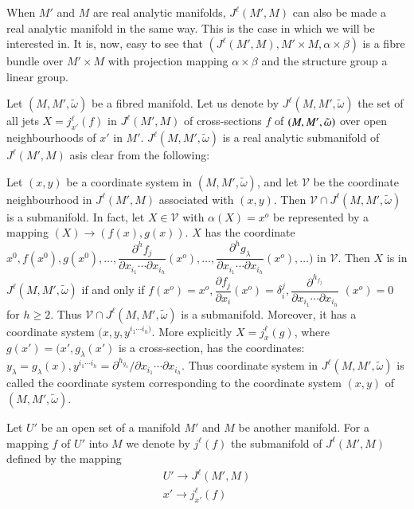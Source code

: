 When $M'$ and $M$ are real analytic manifolds, $J^\ell (M', M)$ can
also be made a real analytic manifold in the same way. This is the
case in which we will be interested in. It is, now, easy to see that
$(J^\ell(M',M), M' \times M, \alpha \times \beta)$ is a fibre bundle
over $M' \times M$ with projection mapping $\alpha \times \beta$ and
the structure group a linear group. 
  
Let $(M, M', \tilde{\omega})$ be a fibred manifold. Let us denote by
$J^\ell (M,M', \tilde{\omega})$ the set of all jets $X=
j^\ell_{x'}(f)$ in $J^\ell (M',M)$ of cross-sections $f$ of $(M,M',\break
\tilde{\omega})$ over open neighbourhoods of $x'$ in $M'$. $J^\ell
(M,M', \tilde{\omega})$  is a real analytic submanifold of  $J^\ell
(M',M)$ as\pageoriginale is clear from the following: 

Let $(x, y)$ be a coordinate system in $(M, M' , \tilde{\omega})$, and
let $\mathcal{V}$ be the coordinate neighbourhood in $J^\ell (M', M)$
associated with $(x, y)$. Then $\mathcal{V} \cap J^\ell (M,M',
\tilde{\omega})$ is a submanifold. In fact, let $X \in \mathcal{V}$
with $\alpha (X)= x^o$ be represented by a mapping $(X) \to (f(x),
g(x))$. $X$ has the coordinate $x^0,f(x^0), g(x^0) , \ldots
,\dfrac{\partial^h f_j}{\partial {x_{i_{1}}}\cdots
  \partial{x_{i_{h}}}} (x^o) , \ldots , \dfrac{\partial^h
  g_\lambda}{\partial{x_{i_{1}}}\cdots \partial{x_{i_{h}}}} (x^o) ,
\ldots)$ in $\mathscr{V}$. Then $X$ is in $J^\ell (M, M',
\tilde{\omega})$ if and only if $f(x^o)= x^o, \dfrac{\partial
  f_j}{\partial x_i}(x^o) = \delta^j_i,
\dfrac{\partial^{h_{f_{j}}}}{\partial{x_{i_{1}}}\cdots
  \partial{x_{i_{h}}}}$ $(x^o) =0$ for $h \ge 2$. Thus $\mathscr{V}
\cap J^\ell (M,M', \tilde{\omega})$ is a submanifold. Moreover, it has
a coordinate system $(x,y,y^{i_1 \cdots i_h)}$. More explicitly $X=
j^\ell_x(g)$, where $g(x') = (x', g_\lambda (x')$ is a cross-section,
has the coordinates: $y_\lambda = g_\lambda (x), y^{i_{1}\cdots i_{h}}
= \partial^{h_{g_\lambda}}/  \partial {x_{i_{1}}}\cdots
\partial x_{i_{h}}$. Thus coordinate system in $J^\ell(M,M',
\tilde{\omega})$ is called the coordinate system corresponding to the
coordinate system $(x,y)$ of $(M,M',\tilde{\omega})$. 
  
Let $U'$ be an open set of a manifold $M'$ and $M$ be another
manifold. For a mapping $f$ of  $U'$ into $M$ we denote by $j^\ell
(f)$ the submanifold of $J^\ell (M',M)$ defined by the mapping   
\begin{gather*}
  U' \to J^\ell(M', M) \\
  x' \to j^\ell_{x'}(f) 
\end{gather*}  
    
